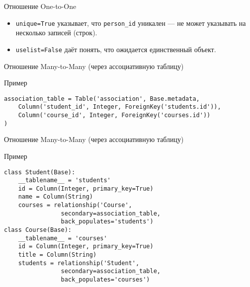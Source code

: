 \documentclass{beamer}
\begin{document}
\begin{frame}[fragile]{Отношение One-to-One}
	\begin{itemize}
		\item \texttt{unique=True} указывает, что \texttt{person\_id} уникален —
		      не может указывать на несколько записей (строк).
		\item \texttt{uselist=False} даёт понять, что ожидается единственный объект.
	\end{itemize}
\end{frame}

\begin{frame}[fragile]{Отношение Many-to-Many (через ассоциативную таблицу)}
	\begin{block}{Пример}
		\begin{verbatim}
association_table = Table('association', Base.metadata,
    Column('student_id', Integer, ForeignKey('students.id')),
    Column('course_id', Integer, ForeignKey('courses.id'))
)

\end{verbatim}
	\end{block}
\end{frame}

\begin{frame}[fragile]{Отношение Many-to-Many (через ассоциативную таблицу)}
	\begin{block}{Пример}
		\begin{verbatim}
class Student(Base):
    __tablename__ = 'students'
    id = Column(Integer, primary_key=True)
    name = Column(String)
    courses = relationship('Course',
                secondary=association_table,
                back_populates='students')
class Course(Base):
    __tablename__ = 'courses'
    id = Column(Integer, primary_key=True)
    title = Column(String)
    students = relationship('Student',
                secondary=association_table,
                back_populates='courses')
\end{verbatim}
	\end{block}
\end{frame}
\end{document}
